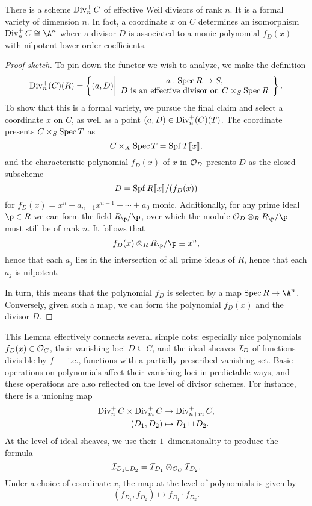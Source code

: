 \begin{lemma}
There is a scheme $\operatorname{Div}_n^+ C$ of effective Weil divisors of rank $n$.  It is a formal variety of dimension $n$.  In fact, a coordinate $x$ on $C$ determines an isomorphism $\Div_n^+ C \cong \A^n$ where a divisor $D$ is associated to a monic polynomial $f_D(x)$ with nilpotent lower-order coefficients.
\end{lemma}
\begin{proof}[Proof sketch]
To pin down the functor we wish to analyze, we make the definition \[\operatorname{Div}_n^+(C)(R) = \left\{(a, D) \middle| \begin{array}{c} a: \operatorname{Spec} R \to S, \\ \text{$D$ is an effective divisor on $C \times_S \operatorname{Spec} R$} \end{array} \right\}.\]  To show that this is a formal variety, we pursue the final claim and select a coordinate $x$ on $C$, as well as a point $(a, D) \in \operatorname{Div}_n^+(C)(T)$.  The coordinate presents $C \times_S \operatorname{Spec} T$ as \[C \times_X \operatorname{Spec} T = \operatorname{Spf} T\llbracket x \rrbracket,\] and the characteristic polynomial $f_D(x)$ of $x$ in $\mathcal{O}_D$ presents $D$ as the closed subscheme \[D = \operatorname{Spf} R\llbracket x \rrbracket / (f_D(x))\] for $f_D(x) = x^n + a_{n-1} x^{n-1} + \cdots + a_0$ monic.  Additionally, for any prime ideal $\p \in R$ we can form the field $R_{\p} / \p$, over which the module $\sheaf O_D \otimes_R R_{\p} / \p$ must still be of rank $n$.  It follows that \[f_D(x) \otimes_R R_{\p} / \p \equiv x^n,\] hence that each $a_j$ lies in the intersection of all prime ideals of $R$, hence that each $a_j$ is nilpotent.

In turn, this means that the polynomial $f_D$ is selected by a map $\Spec R \to \A^n$.  Conversely, given such a map, we can form the polynomial $f_D(x)$ and the divisor $D$.
\end{proof}

\begin{remark}\label{DescriptionOfSqCupMapOnPolynomials}
This Lemma effectively connects several simple dots: especially nice polynomials $f_D(x) \in \mathcal{O}_C$, their vanishing loci $D \subseteq C$, and the ideal sheaves $\mathcal{I}_D$ of functions divisible by $f$ --- i.e., functions with a partially prescribed vanishing set.  Basic operations on polynomials affect their vanishing loci in predictable ways, and these operations are also reflected on the level of divisor schemes.  For instance, there is a unioning map
\begin{align*}
\operatorname{Div}_n^+ C \times \operatorname{Div}_m^+ C & \to \operatorname{Div}_{n+m}^+ C, \\
(D_1, D_2) & \mapsto D_1 \sqcup D_2.
\end{align*}
At the level of ideal sheaves, we use their $1$--dimensionality to produce the formula \[\mathcal{I}_{D_1 \sqcup D_2} = \mathcal{I}_{D_1} \otimes_{\mathcal{O}_C} \mathcal{I}_{D_2}.\]  Under a choice of coordinate $x$, the map at the level of polynomials is given by \[(f_{D_1}, f_{D_2}) \mapsto f_{D_1} \cdot f_{D_2}.\]
\end{remark}

